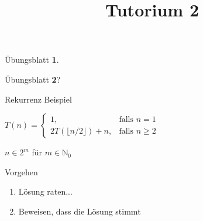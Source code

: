 
\title[Algorithmen I SS 14]{Tutorium 2}

\usepackage{alltt}




\begin{frame}
  \maketitle
\end{frame}

\begin{frame}
	\Huge
	\begin{center}
		Übungsblatt \textbf{1}.
	\end{center}
\end{frame}

\begin{frame}
	\Huge
	\begin{center}
		Übungsblatt \textbf{2}?
	\end{center}
\end{frame}



\begin{frame}{Rekurrenz Beispiel}
	\begin{center}
		$ T(n)=\left\{\begin{array}{cr} 1, & \mbox{falls } n = 1\\ 2 T(\lfloor n / 2 \rfloor) + n, & \mbox{falls } n \geq 2 \end{array}\right. $

		\parskip 14pt
		$n \in 2 ^{m} $ für $ m \in \mathbb{N} _{0} $

	\end{center}
	\begin{block}{Vorgehen}
		\begin{enumerate}
			\item Lösung raten...
			\item Beweisen, dass die Lösung stimmt
		\end{enumerate}
	\end{block}
\end{frame}

